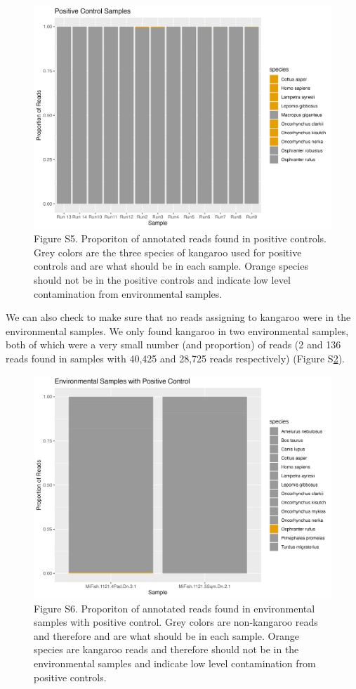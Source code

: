 \documentclass[
]{article}
\begin{document}
\begin{figure}
\centering
\includegraphics{../Output/SupplementalFigures/check_controls.png}
\caption{Figure S5. Proporiton of annotated reads found in positive
controls. Grey colors are the three species of kangaroo used for
positive controls and are what should be in each sample. Orange species
should not be in the positive controls and indicate low level
contamination from environmental samples.\label{fig:controls1}}
\end{figure}

We can also check to make sure that no reads assigning to kangaroo were
in the environmental samples. We only found kangaroo in two
environmental samples, both of which were a very small number (and
proportion) of reads (2 and 136 reads found in samples with 40,425 and
28,725 reads respectively) (Figure S\ref{fig:controls2}).

\begin{figure}
\centering
\includegraphics{../Output/SupplementalFigures/check_controls2.png}
\caption{Figure S6. Proporiton of annotated reads found in environmental
samples with positive control. Grey colors are non-kangaroo reads and
therefore and are what should be in each sample. Orange species are
kangaroo reads and therefore should not be in the environmental samples
and indicate low level contamination from positive
controls.\label{fig:controls2}}
\end{figure}
\end{document}

